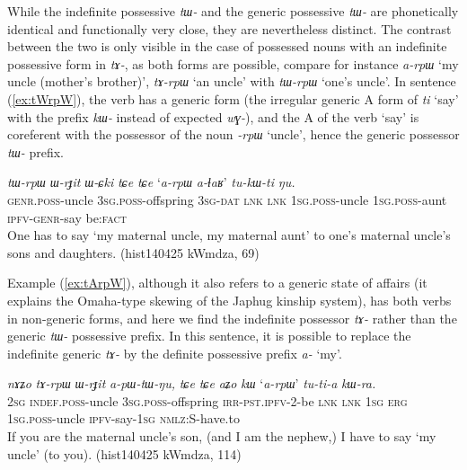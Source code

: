 \documentclass[oneside,a4paper,11pt]{article}
\newcommand{\ipa}[1]{\textit{\phon\mbox{#1}}} %
\newcommand{\refb}[1]{(\ref{#1})}
\begin{document}
While the indefinite possessive \ipa{tɯ-} and the generic possessive \ipa{tɯ-} are phonetically identical and functionally very close, they are nevertheless distinct. The contrast between the two is only visible in the case of possessed nouns with an indefinite possessive form in \ipa{tɤ-}, as both forms are possible, compare for instance \ipa{a-rpɯ} `my uncle (mother's brother)', \ipa{tɤ-rpɯ} `an uncle' with \ipa{tɯ-rpɯ} `one's uncle'. In sentence \refb{ex:tWrpW}, the verb has a generic form (the irregular generic A form of \ipa{ti} `say' with the prefix \ipa{kɯ-} instead of expected \ipa{wɣ-}), and the A of the verb `say' is coreferent with the possessor of the noun   \ipa{-rpɯ}  `uncle', hence the generic possessor \ipa{tɯ-} prefix.

\begin{exe}
\ex \label{ex:tWrpW}
\gll
 \ipa{tɯ-rpɯ} 	\ipa{ɯ-rɟit} 	\ipa{ɯ-ɕki} 	\ipa{tɕe} 	\ipa{tɕe} 	`\ipa{a-rpɯ} \ipa{a-ɬaʁ}' 	\ipa{tu-kɯ-ti} 	\ipa{ŋu.} \\
\textsc{genr.poss}-uncle \textsc{3sg.poss}-offspring \textsc{3sg-dat} \textsc{lnk} \textsc{lnk} \textsc{1sg.poss}-uncle \textsc{1sg.poss}-aunt \textsc{ipfv-genr}-say be:\textsc{fact} \\
\glt One has to say `my maternal uncle, my maternal aunt' to one's maternal uncle's sons and daughters. (hist140425 kWmdza, 69)
\end{exe}

Example \refb{ex:tArpW}, although it also refers to a generic state of affairs (it explains the Omaha-type skewing of the Japhug kinship system), has both verbs in non-generic forms, and here we find the indefinite possessor \ipa{tɤ-} rather than the generic \ipa{tɯ-} possessive prefix. In this sentence, it is possible to replace the indefinite generic \ipa{tɤ-} by the definite possessive prefix \ipa{a-} `my'.

\begin{exe}
\ex  \label{ex:tArpW}
\gll
\ipa{nɤʑo} 	\ipa{tɤ-rpɯ} 	\ipa{ɯ-rɟit} 	\ipa{a-pɯ-tɯ-ŋu,} 	\ipa{tɕe} 	\ipa{tɕe} 	\ipa{aʑo} 	\ipa{kɯ} 	`\ipa{a-rpɯ}' 	\ipa{tu-ti-a} 	\ipa{kɯ-ra.}  \\
\textsc{2sg} \textsc{indef.poss}-uncle \textsc{3sg.poss}-offspring \textsc{irr-pst.ipfv}-2-be \textsc{lnk} \textsc{lnk} \textsc{1sg} \textsc{erg}  \textsc{1sg.poss}-uncle \textsc{ipfv}-say-\textsc{1sg} \textsc{nmlz:S}-have.to  \\
\glt If you are the maternal uncle's son, (and I am the nephew,) I have to say `my uncle' (to you).  (hist140425 kWmdza, 114)
\end{exe}
\end{document}
